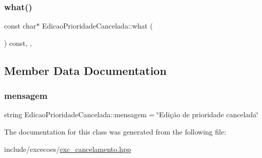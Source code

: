 \subsubsection{\texorpdfstring{what()}{what()}}
{\footnotesize\ttfamily const char$\ast$ Edicao\+Prioridade\+Cancelada\+::what (\begin{DoxyParamCaption}{ }\end{DoxyParamCaption}) const\hspace{0.3cm}{\ttfamily [inline]}, {\ttfamily [override]}, {\ttfamily [noexcept]}}



\subsection{Member Data Documentation}
\mbox{\label{classEdicaoPrioridadeCancelada_aa394e119ef20d94ce5ba0633dc0294d2}} 
\subsubsection{\texorpdfstring{mensagem}{mensagem}}
{\footnotesize\ttfamily string Edicao\+Prioridade\+Cancelada\+::mensagem = \char`\"{}Edição de prioridade cancelada\char`\"{}\hspace{0.3cm}{\ttfamily [private]}}



The documentation for this class was generated from the following file\+:\begin{DoxyCompactItemize}
\item 
include/excecoes/\hyperlink{exc__cancelamento_8hpp}{exc\+\_\+cancelamento.\+hpp}\end{DoxyCompactItemize}
